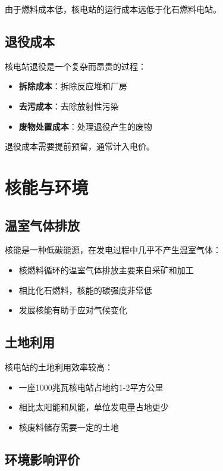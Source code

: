 \documentclass[12pt,UTF8]{ctexbook}
\begin{document}
由于燃料成本低，核电站的运行成本远低于化石燃料电站。

\section{退役成本}

核电站退役是一个复杂而昂贵的过程：

\begin{itemize}[leftmargin=2cm]
    \item \textbf{拆除成本}：拆除反应堆和厂房
    \item \textbf{去污成本}：去除放射性污染
    \item \textbf{废物处置成本}：处理退役产生的废物
\end{itemize}

退役成本需要提前预留，通常计入电价。

\chapter{核能与环境}

\section{温室气体排放}

核能是一种低碳能源，在发电过程中几乎不产生温室气体：

\begin{itemize}[leftmargin=2cm]
    \item 核燃料循环的温室气体排放主要来自采矿和加工
    \item 相比化石燃料，核能的碳强度非常低
    \item 发展核能有助于应对气候变化
\end{itemize}

\section{土地利用}

核电站的土地利用效率较高：

\begin{itemize}[leftmargin=2cm]
    \item 一座1000兆瓦核电站占地约1-2平方公里
    \item 相比太阳能和风能，单位发电量占地更少
    \item 核废料储存需要一定的土地
\end{itemize}

\section{环境影响评价}
\end{document}

